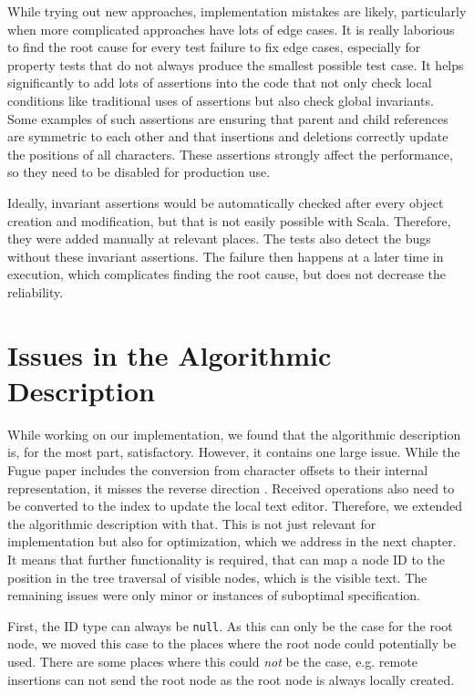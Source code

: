 While trying out new approaches, implementation mistakes are likely, particularly when more complicated approaches have lots of edge cases. It is really laborious to find the root cause for every test failure to fix edge cases, especially for property tests that do not always produce the smallest possible test case. It helps significantly to add lots of assertions into the code that not only check local conditions like traditional uses of assertions but also check global invariants. Some examples of such assertions are ensuring that parent and child references are symmetric to each other and that insertions and deletions correctly update the positions of all characters. These assertions strongly affect the performance, so they need to be disabled for production use.

Ideally, invariant assertions would be automatically checked after every object creation and modification, but that is not easily possible with Scala. Therefore, they were added manually at relevant places. The tests also detect the bugs without these invariant assertions. The failure then happens at a later time in execution, which complicates finding the root cause, but does not decrease the reliability.

\section{Issues in the Algorithmic Description} \label{section:implementation-issues-algorithmic-description}

While working on our implementation, we found that the algorithmic description \cite[Algorithm~1]{2023-weidner-minimizing-interleaving} is, for the most part, satisfactory. However, it contains one large issue. While the Fugue paper includes the conversion from character offsets to their internal representation, it misses the reverse direction \cite[Algorithm~1]{2023-weidner-minimizing-interleaving}. Received operations also need to be converted to the index to update the local text editor. Therefore, we extended the algorithmic description with that. This is not just relevant for implementation but also for optimization, which we address in the next chapter. It means that further functionality is required, that can map a node ID to the position in the tree traversal of visible nodes, which is the visible text. The remaining issues were only minor or instances of suboptimal specification.

First, the ID type \cite[Algorithm~1]{2023-weidner-minimizing-interleaving} can always be \texttt{null}. As this can only be the case for the root node, we moved this case to the places where the root node could potentially be used. There are some places where this could \textit{not} be the case, e.g. remote insertions can not send the root node as the root node is always locally created.

